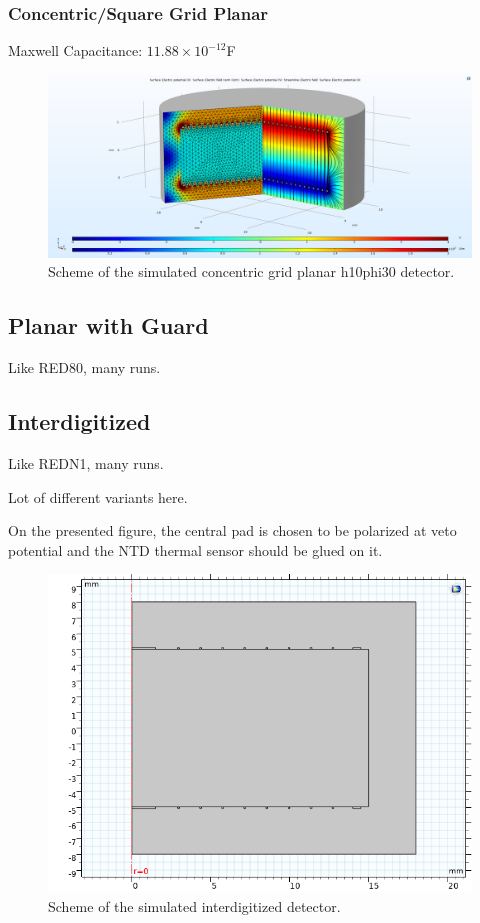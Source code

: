 \subsubsection{Concentric/Square Grid Planar}

Maxwell Capacitance: $11.88 \times 10^{-12}$F

\begin{figure}
\centering
\includegraphics[width=\linewidth]{Figures/Electrodes/concentric_grid_planar.png}
\caption{Scheme of the simulated concentric grid planar h10phi30 detector.}
\label{fig:concentric-grid-planar}
\end{figure}

\subsection{Planar with Guard}

Like RED80, many runs.

\subsection{Interdigitized}

Like REDN1, many runs.

Lot of different variants here.

On the presented figure, the central pad is chosen to be polarized at veto potential and the NTD thermal sensor should be glued on it.

\begin{figure}
\centering
\includegraphics[width=\linewidth]{Figures/Electrodes/ID_geometry.png}
\caption{Scheme of the simulated interdigitized detector.}
\label{fig:concentric-grid-planar}
\end{figure}

